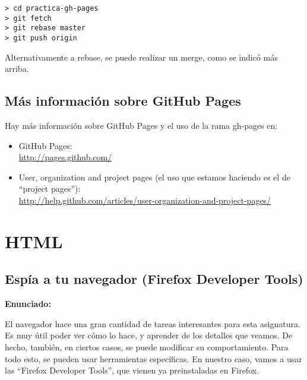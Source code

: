 \begin{verbatim}
> cd practica-gh-pages
> git fetch
> git rebase master
> git push origin
\end{verbatim}

Alternativamente a rebase, se puede realizar un merge, como se indicó más arriba.

\subsection{Más información sobre GitHub Pages}

Hay más información sobre GitHub Pages y  el uso de la rama gh-pages en:

\begin{itemize}
\item GitHub Pages: \\
  \url{http://pages.github.com/}
\item User, organization and project pages (el uso que estamos haciendo es el de ``project pages''): \\
  \url{http://help.github.com/articles/user-organization-and-project-pages/}
\end{itemize}


\section{HTML}

\subsection{Espía a tu navegador (Firefox Developer Tools)}
\label{subsec:eje-html-firefox}

\textbf{Enunciado:}

El navegador hace una gran cantidad de tareas interesantes para esta asignatura. Es muy útil poder ver cómo lo hace, y aprender de los detalles que veamos. De hecho, también, en ciertos casos, se puede modificar su comportamiento. Para todo esto, se pueden usar herramientas específicas. En nuestro caso, vamos a usar las ``Firefox Developer Tools'', que vienen ya preinstaladas en Firefox.

